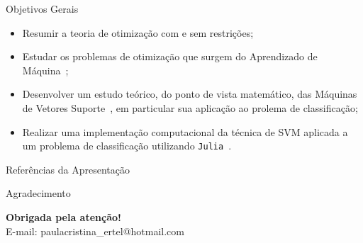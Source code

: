 \documentclass{beamer}
\theoremstyle{definition}%
\begin{document}
\begin{frame}{Objetivos Gerais}
\begin{block}{}
\begin{itemize}
	\item Resumir a teoria de otimização com e sem restrições;

	\item Estudar os problemas de otimização que surgem do Aprendizado de Máquina~\cite{Ana1994,Ademir2013};

	\item Desenvolver um estudo teórico, do ponto de vista matemático, das Máquinas de Vetores Suporte~\cite{Faisal2019,Evelin2017}, em particular sua aplicação ao prolema de classificação;



	\item Realizar uma implementação computacional da técnica de SVM aplicada a um problema de classificação utilizando \texttt{Julia}~\cite{Bezanson:2017g}.
\end{itemize}
\end{block}
\end{frame}


%





\begin{frame}{Referências da Apresentação}
\printbibliography
\end{frame}

\begin{frame}{Agradecimento}

\begin{block}{}

\centering
\Large{\textbf{Obrigada pela atenção!}}
$$$$
{\normalsize E-mail: paulacristina\_ertel@hotmail.com }

\end{block}
\end{frame}
\end{document}
